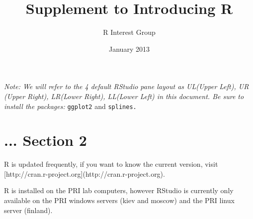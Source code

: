 \documentclass{article}
\title{Supplement to Introducing R}
\author{R Interest Group}
\date{January 2013}
\begin{document}
\maketitle

\emph{
Note: We will refer to the 4 default RStudio pane layout as UL(Upper Left), UR (Upper Right), LR(Lower Right), LL(Lower Left) in this document.  Be sure to install the packages:} \texttt{ggplot2} and \texttt{splines.}


\section*{... Section 2}
R is updated frequently, if you want to know the current version, visit [http://cran.r-project.org](http://cran.r-project.org).   

R is installed on the PRI lab computers, however RStudio is currently only available on the PRI windows servers (kiev and moscow) and the PRI linux server (finland). 
\end{document}
